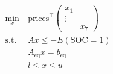 \documentclass[preview]{standalone}
\begin{document}
\begin{align*}
\begin{aligned}\min_{x} &\ \text{prices}^\top \begin{pmatrix} x_1\\ \vdots\\  &x_7 \end{pmatrix} \\\text{s.t.} &\ Ax \leq -E\left(\text{SOC}=1\right) \\&\ A_\text{eq} x = b_\text{eq} \\&\ l \leq x \leq u \end{aligned}
\end{align*}
\end{document}
